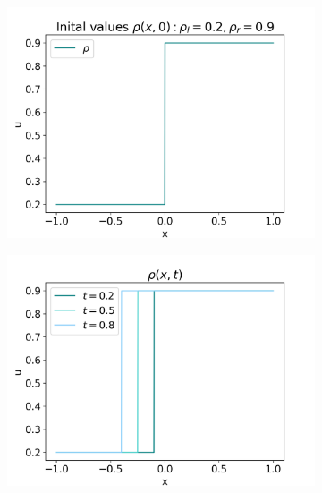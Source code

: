\documentclass[10pt]{article}
\numberwithin{equation}{section}
\begin{document}
\begin{figure}
     \centering
     \begin{subfigure}[b]{0.3\textwidth}
         \centering
         \includegraphics[width=\textwidth]{Figures/Model/Plots/BackwShockIV.png}
     \end{subfigure}
     \hfill
     \begin{subfigure}[b]{0.3\textwidth}
         \centering
         \includegraphics[width=\textwidth]{Figures/Model/Plots/BackwShockAtTime.png}
     \end{subfigure}

\end{figure}
\end{document}
